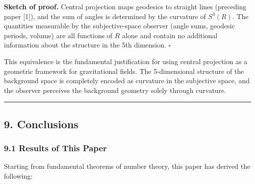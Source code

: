 \documentclass[a4paper,11pt]{article}
\begin{document}
\textbf{Sketch of proof.} Central projection maps geodesics to straight
lines (preceding paper {[}1{]}), and the sum of angles is determined by
the curvature of \(S^4(R)\). The quantities measurable by the
subjective-space observer (angle sums, geodesic periods, volume) are all
functions of \(R\) alone and contain no additional information about the
structure in the 5th dimension. \(\square\)

This equivalence is the fundamental justification for using central
projection as a geometric framework for gravitational fields. The
5-dimensional structure of the background space is completely encoded as
curvature in the subjective space, and the observer perceives the
background geometry solely through curvature.

\begin{center}\rule{0.5\linewidth}{0.5pt}\end{center}

\subsection{9. Conclusions}\label{conclusions}

\subsubsection{9.1 Results of This Paper}\label{results-of-this-paper}

Starting from fundamental theorems of number theory, this paper has
derived the following:
\end{document}
